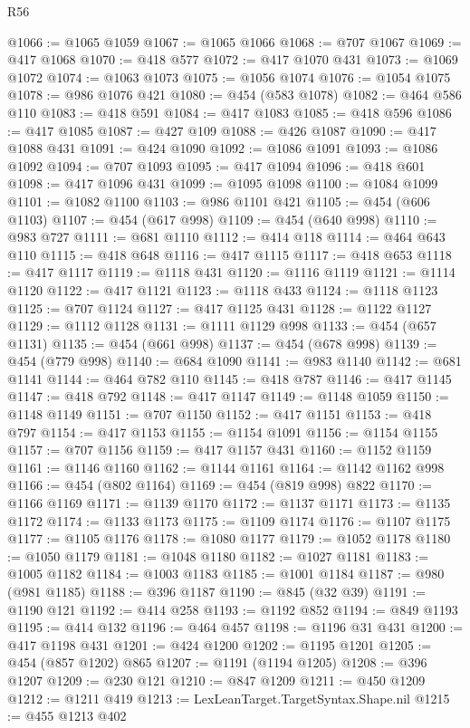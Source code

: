 \begin{lexlean}{R56}
\begin{coremodule}
@1066 := @1065 @1059
@1067 := @1065 @1066
@1068 := @707 @1067
@1069 := @417 @1068
@1070 := @418 @577
@1072 := @417 @1070 @431
@1073 := @1069 @1072
@1074 := @1063 @1073
@1075 := @1056 @1074
@1076 := @1054 @1075
@1078 := @986 @1076 @421
@1080 := @454 (@583 @1078)
@1082 := @464 @586 @110
@1083 := @418 @591
@1084 := @417 @1083
@1085 := @418 @596
@1086 := @417 @1085
@1087 := @427 @109
@1088 := @426 @1087
@1090 := @417 @1088 @431
@1091 := @424 @1090
@1092 := @1086 @1091
@1093 := @1086 @1092
@1094 := @707 @1093
@1095 := @417 @1094
@1096 := @418 @601
@1098 := @417 @1096 @431
@1099 := @1095 @1098
@1100 := @1084 @1099
@1101 := @1082 @1100
@1103 := @986 @1101 @421
@1105 := @454 (@606 @1103)
@1107 := @454 (@617 @998)
@1109 := @454 (@640 @998)
@1110 := @983 @727
@1111 := @681 @1110
@1112 := @414 @118
@1114 := @464 @643 @110
@1115 := @418 @648
@1116 := @417 @1115
@1117 := @418 @653
@1118 := @417 @1117
@1119 := @1118 @431
@1120 := @1116 @1119
@1121 := @1114 @1120
@1122 := @417 @1121
@1123 := @1118 @433
@1124 := @1118 @1123
@1125 := @707 @1124
@1127 := @417 @1125 @431
@1128 := @1122 @1127
@1129 := @1112 @1128
@1131 := @1111 @1129 @998
@1133 := @454 (@657 @1131)
@1135 := @454 (@661 @998)
@1137 := @454 (@678 @998)
@1139 := @454 (@779 @998)
@1140 := @684 @1090
@1141 := @983 @1140
@1142 := @681 @1141
@1144 := @464 @782 @110
@1145 := @418 @787
@1146 := @417 @1145
@1147 := @418 @792
@1148 := @417 @1147
@1149 := @1148 @1059
@1150 := @1148 @1149
@1151 := @707 @1150
@1152 := @417 @1151
@1153 := @418 @797
@1154 := @417 @1153
@1155 := @1154 @1091
@1156 := @1154 @1155
@1157 := @707 @1156
@1159 := @417 @1157 @431
@1160 := @1152 @1159
@1161 := @1146 @1160
@1162 := @1144 @1161
@1164 := @1142 @1162 @998
@1166 := @454 (@802 @1164)
@1169 := @454 (@819 @998) @822
@1170 := @1166 @1169
@1171 := @1139 @1170
@1172 := @1137 @1171
@1173 := @1135 @1172
@1174 := @1133 @1173
@1175 := @1109 @1174
@1176 := @1107 @1175
@1177 := @1105 @1176
@1178 := @1080 @1177
@1179 := @1052 @1178
@1180 := @1050 @1179
@1181 := @1048 @1180
@1182 := @1027 @1181
@1183 := @1005 @1182
@1184 := @1003 @1183
@1185 := @1001 @1184
@1187 := @980 (@981 @1185)
@1188 := @396 @1187
@1190 := @845 (@32 @39)
@1191 := @1190 @121
@1192 := @414 @258
@1193 := @1192 @852
@1194 := @849 @1193
@1195 := @414 @132
@1196 := @464 @457
@1198 := @1196 @31 @431
@1200 := @417 @1198 @431
@1201 := @424 @1200
@1202 := @1195 @1201
@1205 := @454 (@857 @1202) @865
@1207 := @1191 (@1194 @1205)
@1208 := @396 @1207
@1209 := @230 @121
@1210 := @847 @1209
@1211 := @450 @1209
@1212 := @1211 @419
@1213 := LexLeanTarget.TargetSyntax.Shape.nil
@1215 := @455 @1213 @402

\end{coremodule}
\end{lexlean}
